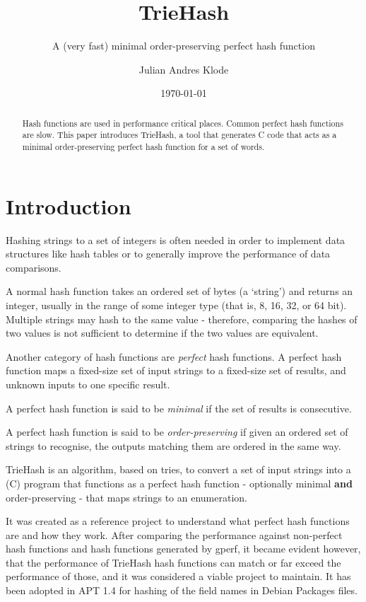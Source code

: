 \documentclass[parskip=half]{scrartcl}
\author{Julian Andres Klode}
\title{TrieHash}
\subtitle{A (very fast) minimal order-preserving perfect hash function}
\date{\today}
\begin{document}
    \maketitle{}
    \begin{abstract}
        Hash functions are used in performance critical places. Common perfect
        hash functions are slow. This paper introduces TrieHash, a tool that generates
        C code that acts as a minimal order-preserving perfect hash function
        for a set of words.
    \end{abstract}
    \section{Introduction}
    Hashing strings to a set of integers is often needed in order to implement
    data structures like hash tables or to generally improve the performance of
    data comparisons.

    A normal hash function takes an ordered set of bytes (a `string') and returns an
    integer, usually in the range of some integer type (that is, 8, 16, 32,
    or 64 bit). Multiple strings may hash to the same value - therefore,
    comparing the hashes of two values is not sufficient to determine if the
    two values are equivalent.

    Another category of hash functions are \textit{perfect} hash functions.
    A perfect hash function maps a fixed-size set of input strings to a
    fixed-size set of results, and unknown inputs to one specific result.

    A perfect hash function is said to be \textit{minimal} if the set of
    results is consecutive.

    A perfect hash function is said to be \textit{order-preserving}
    if given an ordered set of strings to recognise, the outputs matching them
    are ordered in the same way.

    TrieHash is an algorithm, based on tries, to convert a set of input strings
    into a (C) program that functions as a perfect hash function - optionally minimal \textbf{and}
    order-preserving - that maps strings to an enumeration.

    It was created as a reference project to understand what perfect hash
    functions are and how they work. After comparing the performance against
    non-perfect hash functions and hash functions generated by gperf, it
    became evident however, that the performance of TrieHash hash functions
    can match or far exceed the performance of those, and it was considered
    a viable project to maintain. It has been adopted in APT 1.4 for hashing
    of the field names in Debian Packages files.
    
\end{document}
